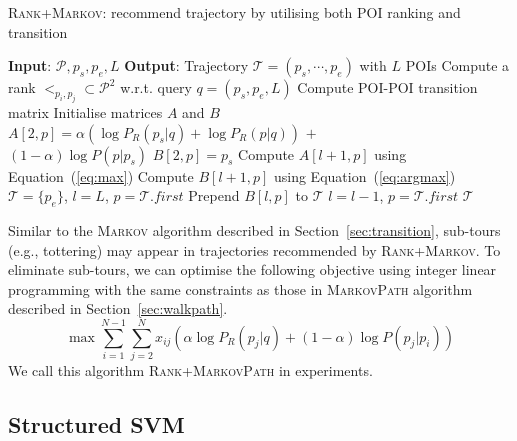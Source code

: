 \begin{algorithm}[t]
\caption{\textsc{Rank+Markov}: recommend trajectory by utilising both POI ranking and transition}
\label{alg:rank+markov}
\begin{algorithmic}[1]
\STATE \textbf{Input}: $\mathcal{P}, p_s, p_e, L$
\STATE \textbf{Output}: Trajectory $\mathcal{T} = (p_s, \cdots, p_e)$ with $L$ POIs
\STATE Compute a rank $<_{p_i, p_j} \subset \mathcal{P}^2$ w.r.t. query $q = (p_s, p_e, L)$
\STATE Compute POI-POI transition matrix
\STATE Initialise matrices $A$ and $B$
    \STATE $A[2, p] = \alpha ( \log P_R(p_s|q) + \log P_R(p|q) )$ $+$ \\ \hfill $(1-\alpha) \log P(p|p_s)$
    \STATE $B[2, p] = p_s$
\ENDFOR
{}
        \STATE Compute $A[l+1, p]$ using Equation~(\ref{eq:max})
        \STATE Compute $B[l+1, p]$ using Equation~(\ref{eq:argmax})
    \ENDFOR
\ENDFOR
\STATE $\mathcal{T}= \{p_e\}$, $l = L$, $p = \mathcal{T}.first$
\REPEAT
    \STATE Prepend $B[l, p]$ to $\mathcal{T}$
    \STATE $l = l - 1$, $p = \mathcal{T}.first$
\RETURN $\mathcal{T}$
\end{algorithmic}
\end{algorithm}

Similar to the \textsc{Markov} algorithm described in Section~\ref{sec:transition},
sub-tours (e.g., tottering) may appear in trajectories recommended by \textsc{Rank+Markov}.
To eliminate sub-tours, we can optimise the following objective using integer linear programming
with the same constraints as those in \textsc{MarkovPath} algorithm described in Section~\ref{sec:walkpath}.
\begin{displaymath}
    \max  \sum_{i=1}^{N-1} \sum_{j=2}^N x_{ij} (\alpha \log P_R(p_j | q) + (1-\alpha) \log P(p_j | p_i))
\end{displaymath}
We call this algorithm \textsc{Rank+MarkovPath} in experiments.

\subsection{Structured SVM}
\label{sec:ssvm}

